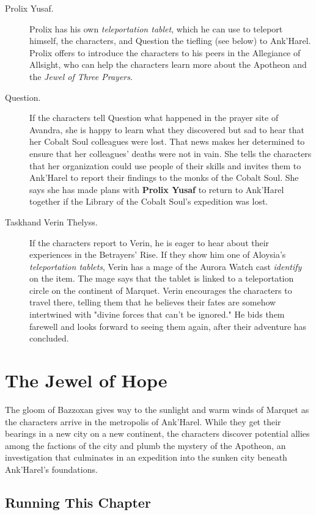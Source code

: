 \documentclass[letterpaper, 11pt, bg=full, twocolumn]{dndbook}
\begin{document}
\begin{description}
\item[Prolix Yusaf.] Prolix has his own \textit{teleportation tablet}, which he can use to teleport himself, the characters, and Question the tiefling (see below) to Ank'Harel. Prolix offers to introduce the characters to his peers in the Allegiance of Allsight, who can help the characters learn more about the Apotheon and the \textit{Jewel of Three Prayers}.
\item[Question.] If the characters tell Question what happened in the prayer site of Avandra, she is happy to learn what they discovered but sad to hear that her Cobalt Soul colleagues were lost. That news makes her determined to ensure that her colleagues' deaths were not in vain. She tells the characters that her organization could use people of their skills and invites them to Ank'Harel to report their findings to the monks of the Cobalt Soul. She says she has made plans with \textbf{Prolix Yusaf} to return to Ank'Harel together if the Library of the Cobalt Soul's expedition was lost.
\item[Taskhand Verin Thelyss.] If the characters report to Verin, he is eager to hear about their experiences in the Betrayers' Rise. If they show him one of Aloysia's \textit{teleportation tablets}, Verin has a mage of the Aurora Watch cast \textit{identify} on the item. The mage says that the tablet is linked to a teleportation circle on the continent of Marquet. Verin encourages the characters to travel there, telling them that he believes their fates are somehow intertwined with "divine forces that can't be ignored." He bids them farewell and looks forward to seeing them again, after their adventure has concluded.
\end{description}

\chapter{The Jewel of Hope}\label{ch:the-jewel-of-hope-5-5}

The gloom of Bazzoxan gives way to the sunlight and warm winds of Marquet as the characters arrive in the metropolis of Ank'Harel. While they get their bearings in a new city on a new continent, the characters discover potential allies among the factions of the city and plumb the mystery of the Apotheon, an investigation that culminates in an expedition into the sunken city beneath Ank'Harel's foundations.
\section{Running This Chapter}
\end{document}
